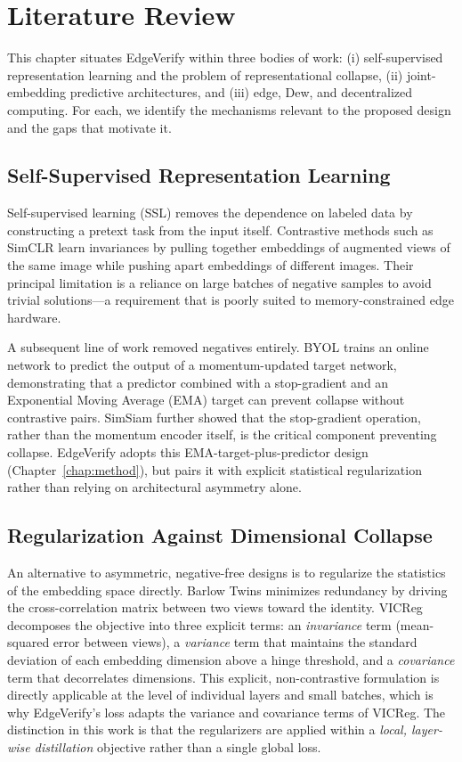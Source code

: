 \chapter{Literature Review}
\label{chap:lit}

This chapter situates EdgeVerify within three bodies of work: (i)
self-supervised representation learning and the problem of representational
collapse, (ii) joint-embedding predictive architectures, and (iii) edge,
Dew, and decentralized computing. For each, we identify the mechanisms
relevant to the proposed design and the gaps that motivate it.

\section{Self-Supervised Representation Learning}
Self-supervised learning (SSL) removes the dependence on labeled data by
constructing a pretext task from the input itself. Contrastive methods
such as SimCLR \cite{chen2020simple} learn invariances by pulling together
embeddings of augmented views of the same image while pushing apart
embeddings of different images. Their principal limitation is a reliance
on large batches of negative samples to avoid trivial solutions---a
requirement that is poorly suited to memory-constrained edge hardware.

A subsequent line of work removed negatives entirely. BYOL
\cite{grill2020bootstrap} trains an online network to predict the output of
a momentum-updated target network, demonstrating that a predictor combined
with a stop-gradient and an Exponential Moving Average (EMA) target can
prevent collapse without contrastive pairs. SimSiam \cite{chen2021exploring}
further showed that the stop-gradient operation, rather than the momentum
encoder itself, is the critical component preventing collapse. EdgeVerify
adopts this EMA-target-plus-predictor design (Chapter~\ref{chap:method}),
but pairs it with explicit statistical regularization rather than relying
on architectural asymmetry alone.

\section{Regularization Against Dimensional Collapse}
An alternative to asymmetric, negative-free designs is to regularize the
statistics of the embedding space directly. Barlow Twins
\cite{zbontar2021barlow} minimizes redundancy by driving the
cross-correlation matrix between two views toward the identity. VICReg
\cite{bardes2022vicreg} decomposes the objective into three explicit
terms: an \emph{invariance} term (mean-squared error between views), a
\emph{variance} term that maintains the standard deviation of each
embedding dimension above a hinge threshold, and a \emph{covariance} term
that decorrelates dimensions. This explicit, non-contrastive formulation
is directly applicable at the level of individual layers and small
batches, which is why EdgeVerify's loss adapts the variance and covariance
terms of VICReg. The distinction in this work is that the regularizers are
applied within a \emph{local, layer-wise distillation} objective rather
than a single global loss.

